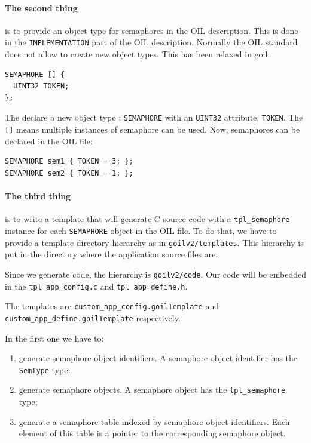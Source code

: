 \documentclass[11pt]{article}
\begin{document}
\paragraph{The second thing} is to provide an object type for semaphores in the OIL description. This is done in the \lstinline{IMPLEMENTATION} part of the OIL description. Normally the OIL standard does not allow to create new object types. This has been relaxed in goil.

\begin{lstlisting}
SEMAPHORE [] {
  UINT32 TOKEN;
};
\end{lstlisting}

The declare a new object type : \lstinline{SEMAPHORE} with an \lstinline{UINT32} attribute, \lstinline{TOKEN}. The \lstinline{[]} means multiple instances of semaphore can be used.
Now, semaphores can be declared in the OIL file:

\begin{lstlisting}
SEMAPHORE sem1 { TOKEN = 3; };
SEMAPHORE sem2 { TOKEN = 1; };
\end{lstlisting}

\paragraph{The third thing} is to write a template that will generate C source code with a \lstinline{tpl_semaphore} instance for each \lstinline{SEMAPHORE} object in the OIL file. To do that, we have to provide a template directory hierarchy as in \lstinline{goilv2/templates}. This hierarchy is put in the directory where the application source files are.

Since we generate code, the hierarchy is \lstinline{goilv2/code}. Our code  will be embedded in the \lstinline{tpl_app_config.c} and \lstinline{tpl_app_define.h}.

The templates are \lstinline{custom_app_config.goilTemplate} and \lstinline{custom_app_define.goilTemplate} respectively.

In the first one we have to:
\begin{enumerate}
\item generate semaphore object identifiers. A semaphore object identifier has the \lstinline{SemType} type;
\item generate semaphore objects. A semaphore object has the \lstinline{tpl_semaphore} type;
\item generate a semaphore table indexed by semaphore object identifiers. Each element of this table is a pointer to the corresponding semaphore object.
\end{enumerate}
\end{document}
